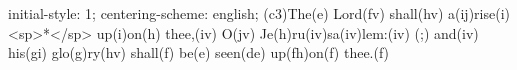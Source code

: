 initial-style: 1;
centering-scheme: english;
(c3)The(e) Lord(fv) shall(hv) a(ij)rise(i) <sp>*</sp> up(i)on(h) thee,(iv) O(jv) Je(h)ru(iv)sa(iv)lem:(iv) (;) and(iv) his(gi) glo(g)ry(hv) shall(f) be(e) seen(de) up(fh)on(f) thee.(f)

